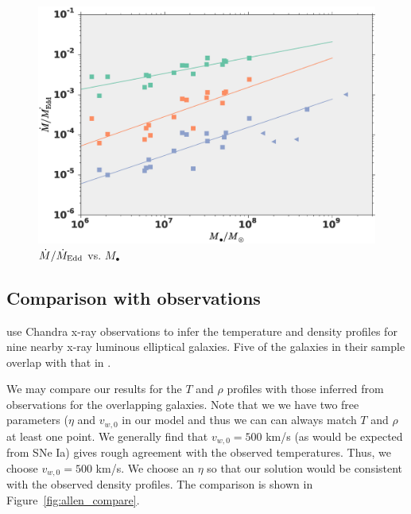 \documentclass[usenatbib,fleqn]{mn2e}
\newcommand{\eddr}{\dot{M}/\dot{M}_{\rm Edd}}
\newcommand{\Mbh}[1][]{M_{\bullet#1}}
\newcommand{\vwO}{v_{w,0}}
\begin{document}
\begin{figure}
\includegraphics[width=\columnwidth]{mdot_mass.eps}
\caption{\label{fig:mdot_mass}$\eddr$ vs. $\Mbh$}
\end{figure}


\subsection{Comparison with observations}
\citealt{AllenDunn+:2006a} use Chandra x-ray observations to infer the temperature and density profiles for nine nearby x-ray luminous elliptical galaxies.  Five of the galaxies in their sample overlap with that in . 

We may compare our results for the $T$ and $\rho$ profiles with those inferred from observations for the overlapping galaxies.  Note that we we have two free parameters ($\eta$ and $\vwO$ in our model and thus we can can always match $T$ and $\rho$ at least one point.  We generally find that $\vwO=500$ km/s (as would be expected from SNe Ia) gives rough agreement with the observed temperatures.  Thus, we choose $\vwO=500$ km/s.  We choose an $\eta$ so that our solution would be consistent with the observed density profiles. The comparison is shown in Figure~\ref{fig:allen_compare}.
\end{document}
